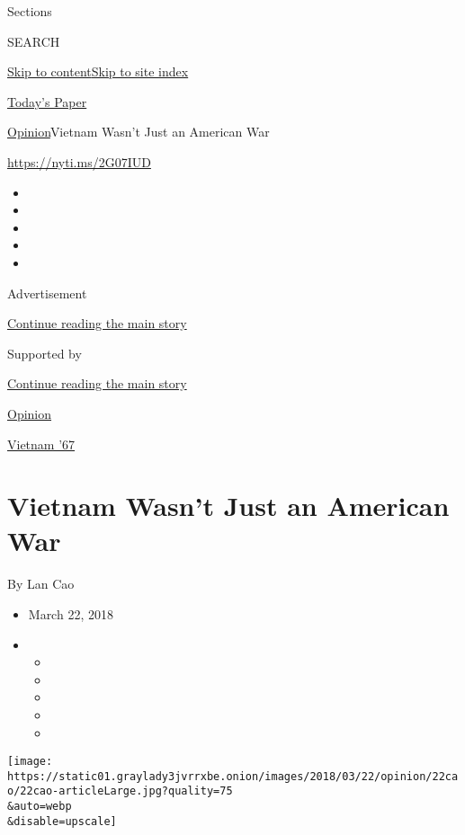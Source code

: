 Sections

SEARCH

\protect\hyperlink{site-content}{Skip to
content}\protect\hyperlink{site-index}{Skip to site index}

\href{https://myaccount.nytimes3xbfgragh.onion/auth/login?response_type=cookie\&client_id=vi}{}

\href{https://www.nytimes3xbfgragh.onion/section/todayspaper}{Today's
Paper}

\href{/section/opinion}{Opinion}\textbar{}Vietnam Wasn't Just an
American War

\url{https://nyti.ms/2G07IUD}

\begin{itemize}
\item
\item
\item
\item
\item
\end{itemize}

Advertisement

\protect\hyperlink{after-top}{Continue reading the main story}

Supported by

\protect\hyperlink{after-sponsor}{Continue reading the main story}

\href{/section/opinion}{Opinion}

\href{/column/vietnam-67}{Vietnam '67}

\hypertarget{vietnam-wasnt-just-an-american-war}{%
\section{Vietnam Wasn't Just an American
War}\label{vietnam-wasnt-just-an-american-war}}

By Lan Cao

\begin{itemize}
\item
  March 22, 2018
\item
  \begin{itemize}
  \item
  \item
  \item
  \item
  \item
  \end{itemize}
\end{itemize}

\texttt{[image: https://static01.graylady3jvrrxbe.onion/images/2018/03/22/opinion/22cao/22cao-articleLarge.jpg?quality=75\\\&auto=webp\\\&disable=upscale]}

